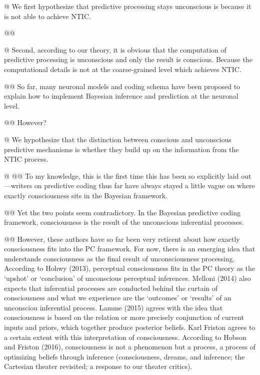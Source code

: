 \documentclass[utf8]{article}
\begin{document}
        \begin{WritingMaterials}
    		@ We first hypothesize that predictive processing stays unconscious is because it is not able to achieve NTIC.
    
    			@@ 
    
    		@ Second, according to our theory, it is obvious that the computation of predictive processing is unconscious and only the result is conscious. Because the computational details is not at the coarse-grained level which achieves NTIC.
    
    			@@ So far, many neuronal models and coding schema have been proposed to explain how to implement Bayesian inference and prediction at the neuronal level.
    
    			@@ However?
    
    
    		@ We hypothesize that the distinction between conscious and unconscious predictive mechanisms is whether they build up on the information from the NTIC process.
    
    			
    
    		@ \cite{lamme2015predictive}
    			@@ To my knowledge, this is the first time this has been so explicitly laid out—writers on predictive coding thus far have always stayed a little vague on where exactly consciousness sits in the Bayesian framework.
    
    			@@ Yet the two points seem contradictory. In the Bayesian predictive coding framework, consciousness is the result of the unconscious inferential processes.
    
    
    			@@ However, these authors have so far been very reticent about how exactly consciousness fits into the PC framework. For now, there is an emerging idea that understands consciousness as the final result of unconsciousness processing. According to Hohwy (2013), perceptual consciousness fits in the PC theory as the ‘upshot’ or ‘conclusion’ of unconscious perceptual inferences. Melloni (2014) also expects that inferential processes are conducted behind the curtain of consciousness and what we experience are the ‘outcomes’ or ‘results’ of an unconsciou inferential process. Lamme (2015) agrees with the idea that consciousness is based on the relation or more precisely conjunction of current inputs and priors, which together produce posterior beliefs. Karl Friston agrees to a certain extent with this interpretation of consciousness. According to Hobson and Friston (2016), consciousness is not a phenomenon but a process, a process of optimizing beliefs through inference (consciousness, dreams, and inference; the Cartesian theater revisited; a response to our theater critics).
    

\end{WritingMaterials}
\end{document}
